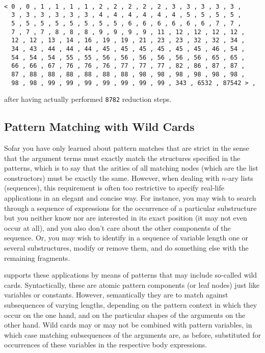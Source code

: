\begin{verbatim}

< 0 , 0 , 1 , 1 , 1 , 1 , 2 , 2 , 2 , 2 , 2 , 3 , 3 , 3 , 3 , 3 ,
  3 , 3 , 3 , 3 , 3 , 3 , 4 , 4 , 4 , 4 , 4 , 4 , 5 , 5 , 5 , 5 ,
  5 , 5 , 5 , 5 , 5 , 5 , 5 , 5 , 6 , 6 , 6 , 6 , 6 , 6 , 7 , 7 ,
  7 , 7 , 7 , 8 , 8 , 8 , 9 , 9 , 9 , 9 , 11 , 12 , 12 , 12 , 12 ,
  12 , 12 , 13 , 14 , 16 , 19 , 19 , 21 , 23 , 23 , 32 , 32 , 34 ,
  34 , 43 , 44 , 44 , 44 , 45 , 45 , 45 , 45 , 45 , 45 , 46 , 54 ,
  54 , 54 , 54 , 55 , 55 , 56 , 56 , 56 , 56 , 56 , 56 , 65 , 65 ,
  66 , 66 , 67 , 76 , 76 , 76 , 77 , 77 , 77 , 82 , 86 , 87 , 87 ,
  87 , 88 , 88 , 88 , 88 , 88 , 88 , 98 , 98 , 98 , 98 , 98 , 98 ,
  98 , 98 , 99 , 99 , 99 , 99 , 99 , 99 , 99 , 343 , 6532 , 87542 > ,

\end{verbatim}
after having  actually performed {\tt 8782} reduction steps.

\subsection{Pattern Matching with Wild Cards}
Sofar you have only learned about pattern matches that are strict in the sense that the argument
terms must {\mys exactly match} the structures specified in the patterns, which is
to say that the arities
of all matching  nodes (which are the list constructors) must be exactly the same. However,
when dealing with $n$-ary lists (sequences), this requirement is often too restrictive to
specify real-life applications in an elegant and concise way. For instance, you may wish to
search through a sequence  of expressions for the occurrence of a particular substructure but you neither
know nor are interested in its exact position (it may not even occur at all),
 and you also don't care about the other
components of the sequence. Or, you may wish to identify in a sequence of variable length
one or several substructures,
modify or remove them, and do something else with the remaining fragments.

\kir supports these applications by means of patterns that may include so-called
{\mys wild cards}. Syntactically, these are atomic pattern components (or leaf nodes) just
like variables or constants.
However, semantically they  are to match against subsequences of varying lengths, depending
on the pattern context in which they occur on the one hand, and on the particular shapes
of the arguments on the other hand. Wild cards may or may not be
combined with pattern variables, in which case matching subsequences of the arguments
are, as before, substituted for occurrences of these variables in the respective body expressions.  

